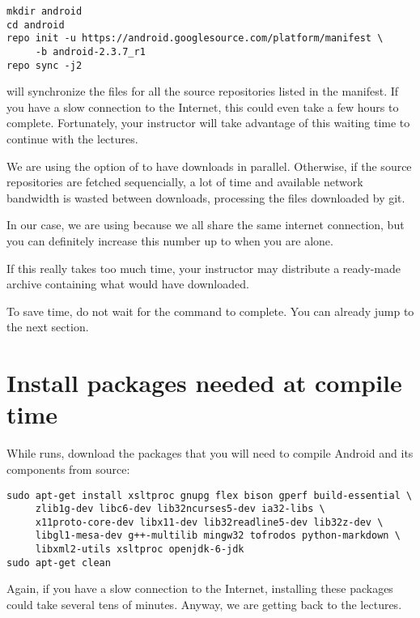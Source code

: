 \begin{verbatim}
mkdir android
cd android
repo init -u https://android.googlesource.com/platform/manifest \
     -b android-2.3.7_r1
repo sync -j2
\end{verbatim}

 will synchronize the files for all the source
repositories listed in the manifest. If you have a slow connection to
the Internet, this could even take a few hours to
complete. Fortunately, your instructor will take advantage of this
waiting time to continue with the lectures.

We are using the  option of  to have 
downloads in parallel. Otherwise, if the source repositories are fetched
sequencially, a lot of time and available network bandwidth is wasted
between downloads, processing the files downloaded by git.

In our case, we are using  because we all share the same
internet connection, but you can definitely increase this number up to
\code{8} when you are alone.

If this really takes too much time, your instructor may distribute a
ready-made archive containing what \code{repo sync} would have
downloaded.

To save time, do not wait for the  command to
complete. You can already jump to the next section.

\section{Install packages needed at compile time}

While  runs, download the packages that you will need
to compile Android and its components from source:

\begin{verbatim}
sudo apt-get install xsltproc gnupg flex bison gperf build-essential \
     zlib1g-dev libc6-dev lib32ncurses5-dev ia32-libs \
     x11proto-core-dev libx11-dev lib32readline5-dev lib32z-dev \
     libgl1-mesa-dev g++-multilib mingw32 tofrodos python-markdown \
     libxml2-utils xsltproc openjdk-6-jdk
sudo apt-get clean
\end{verbatim}

Again, if you have a slow connection to the Internet, installing these
packages could take several tens of minutes. Anyway, we are getting
back to the lectures.
